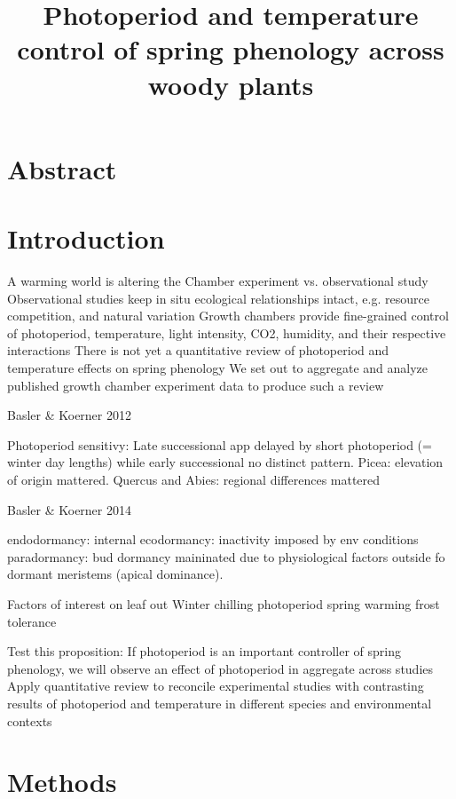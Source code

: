 \documentclass[11pt]{article}
\begin{document}
\title{Photoperiod and temperature control of spring phenology across woody plants}
\maketitle
\section*{Abstract}

\section*{Introduction}

A warming world is altering the 
Chamber experiment vs. observational study
Observational studies keep in situ ecological relationships intact, e.g. resource competition, and natural variation
Growth chambers provide fine-grained control of photoperiod, temperature, light intensity, CO2, humidity, and their respective interactions
There is not yet a quantitative review of photoperiod and temperature effects on spring phenology
We set out to aggregate and analyze published growth chamber experiment data to produce such a review


Basler \& Koerner 2012

Photoperiod sensitivy: Late successional app delayed by short photoperiod (= winter day lengths) while early successional no distinct pattern. 
Picea: elevation of origin mattered. 
Quercus and Abies: regional differences mattered

Basler \& Koerner 2014

endodormancy: internal
ecodormancy: inactivity imposed by env conditions
paradormancy: bud dormancy maininated due to physiological factors outside fo dormant meristems (apical dominance).

Factors of interest on leaf out 
Winter chilling
photoperiod
spring warming
frost tolerance 

Test this proposition: If photoperiod is an important controller of spring phenology, we will observe an effect of photoperiod in aggregate across studies
Apply quantitative review to reconcile experimental studies with contrasting results of photoperiod and temperature in different species and environmental contexts



\section*{Methods}
\end{document}

